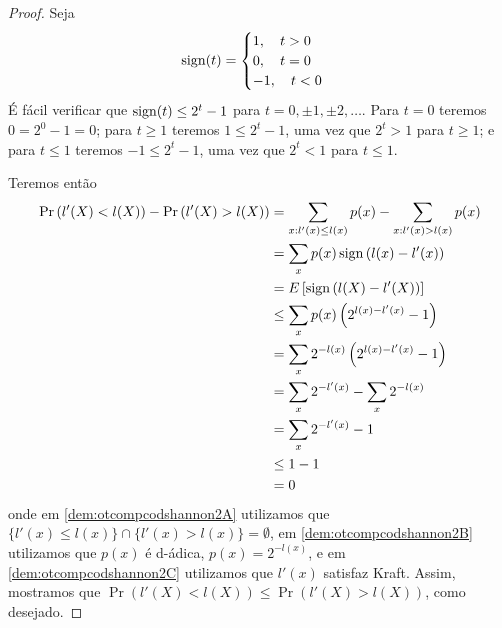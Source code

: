 \begin{proof}
Seja
\begin{equation}
\operatorname{sign}(t) = \begin{cases}
        1 , \quad t > 0 \\
        0 , \quad t = 0 \\
        -1 , \quad t < 0
        \end{cases}
\end{equation}
É fácil verificar que $\operatorname{sign}(t) \leq 2^t -1$ para $t=0,\pm 1, \pm 2, \ldots$.
Para $t = 0$ teremos $0 = 2^0 - 1 = 0$;
para $t \geq 1$ teremos $1 \leq 2^t - 1$, uma vez que $2^t > 1$ para $t \geq 1$;
e para $t \leq 1$ teremos $-1 \leq 2^t - 1$, uma vez que $2^t < 1$ para $t \leq 1$.

Teremos então
\begin{subequations}
{
\allowdisplaybreaks
\begin{align}
\Pr \left( l'(X) < l(X) \right) - \Pr \left( l'(X) > l(X) \right) &= \sum_{x:l'(x) \leq l(x)} p(x) - \sum_{x:l'(x)>l(x)} p(x) \\
             &= \sum_x p(x) \sign\left( l(x)-l'(x) \right) \label{dem:otcompcodshannon2A}\\
             &= E \left[ \sign \left( l(X) - l'(X) \right) \right] \\
             &\leq \sum_x p(x) \left( 2^{l(x) - l'(x)} - 1\right) \\
             &= \sum_x 2^{-l(x)} \left( 2^{l(x)-l'(x)} - 1 \right) \label{dem:otcompcodshannon2B}\\
             &= \sum_x 2^{-l'(x)} - \sum_x 2^{-l(x)} \\
             &= \sum_x 2^{-l'(x)} - 1 \\
             &\leq 1 - 1 \label{dem:otcompcodshannon2C} \\
             &= 0
\end{align}
}
\end{subequations}
onde em \ref{dem:otcompcodshannon2A} utilizamos que $\{l'(x) \leq l(x)\} \cap \{l'(x)>l(x)\} = \emptyset$,
em \ref{dem:otcompcodshannon2B} utilizamos que $p(x)$ é d-ádica, $p(x)=2^{-l(x)}$, e em \ref{dem:otcompcodshannon2C} 
utilizamos que $l'(x)$ satisfaz Kraft.
Assim, mostramos que $\Pr \left( l'(X) < l(X) \right) \leq \Pr \left( l'(X) > l(X) \right)$, como desejado.
\end{proof}




